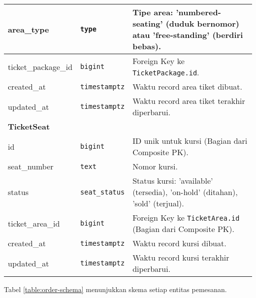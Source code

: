 \begin{longtable}{|l|p{}|p{}|}
	\hline
	area\_type           & \texttt{type}         & Tipe area: 'numbered-seating' (duduk bernomor) atau 'free-standing' (berdiri bebas). \\
	\hline
	ticket\_package\_id  & \texttt{bigint}       & Foreign Key ke \texttt{TicketPackage.id}.                                            \\
	\hline
	created\_at          & \texttt{timestamptz}  & Waktu record area tiket dibuat.                                                      \\
	\hline
	updated\_at          & \texttt{timestamptz}  & Waktu record area tiket terakhir diperbarui.                                         \\
	\hline
	\multicolumn{3}{|l|}{\textbf{TicketSeat}}                                                                                           \\
	\hline
	id                   & \texttt{bigint}       & ID unik untuk kursi (Bagian dari Composite PK).                                      \\
	\hline
	seat\_number         & \texttt{text}         & Nomor kursi.                                                                         \\
	\hline
	status               & \texttt{seat\_status} & Status kursi: 'available' (tersedia), 'on-hold' (ditahan), 'sold' (terjual).         \\
	\hline
	ticket\_area\_id     & \texttt{bigint}       & Foreign Key ke \texttt{TicketArea.id} (Bagian dari Composite PK).                    \\
	\hline
	created\_at          & \texttt{timestamptz}  & Waktu record kursi dibuat.                                                           \\
	\hline
	updated\_at          & \texttt{timestamptz}  & Waktu record kursi terakhir diperbarui.                                              \\
\end{longtable}
\endgroup

Tabel \ref{table:order-schema} menunjukkan skema setiap entitas pemesanan.

